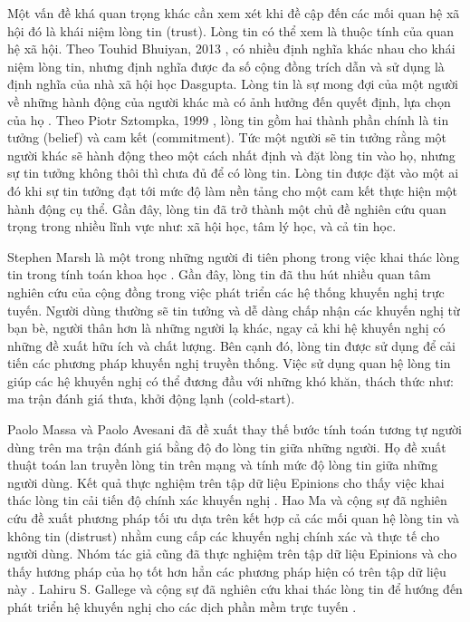 Một vấn đề khá quan trọng khác cần xem xét khi đề cập đến các mối quan hệ xã hội đó là khái niệm lòng tin (trust). Lòng tin có thể xem là thuộc tính của quan hệ xã hội. Theo Touhid Bhuiyan, 2013 \cite{Bhuiyan:2013:TIR:2469991}, có nhiều định nghĩa khác nhau cho khái niệm lòng tin, nhưng định nghĩa được đa số cộng đồng trích dẫn và sử dụng là định nghĩa của nhà xã hội học Dasgupta. Lòng tin là sự mong đợi của một người về những hành động của người khác mà có ảnh hưởng đến quyết định, lựa chọn của họ \cite{Dasgupta1988-DASTAA}. Theo Piotr Sztompka, 1999 \cite{Sztompka1999}, lòng tin gồm hai thành phần chính là tin tưởng (belief) và cam kết (commitment). Tức một người sẽ tin tưởng rằng một người khác sẽ hành động theo một cách nhất định và đặt lòng tin vào họ, nhưng sự tin tưởng không thôi thì chưa đủ để có lòng tin. Lòng tin được đặt vào một ai đó khi sự tin tưởng đạt tới mức độ làm nền tảng cho một cam kết thực hiện một hành động cụ thể. Gần đây, lòng tin đã trở thành một chủ đề nghiên cứu quan trọng trong nhiều lĩnh vực như: xã hội học, tâm lý học, và cả tin học.

Stephen Marsh là một trong những người đi tiên phong trong việc khai thác lòng tin trong tính toán khoa học \cite{Marsh:1994}. Gần đây, lòng tin đã thu hút nhiều quan tâm nghiên cứu của cộng đồng trong việc phát triển các hệ thống khuyến nghị trực tuyến. Người dùng thường sẽ tin tưởng và dễ dàng chấp nhận các khuyến nghị từ bạn bè, người thân hơn là những người lạ khác, ngay cả khi hệ khuyến nghị có những đề xuất hữu ích và chất lượng. Bên cạnh đó, lòng tin được sử dụng để cải tiến các phương pháp khuyến nghị truyền thống. Việc sử dụng quan hệ lòng tin giúp các hệ khuyến nghị có thể đương đầu với những khó khăn, thách thức như: ma trận đánh giá thưa, khởi động lạnh (cold-start).

Paolo Massa và Paolo Avesani đã đề xuất thay thế bước tính toán tương tự người dùng trên ma trận đánh giá bằng độ đo lòng tin giữa những người. Họ đề xuất thuật toán lan truyền lòng tin trên mạng và tính mức độ lòng tin giữa những người dùng. Kết quả thực nghiệm trên tập dữ liệu Epinions cho thấy việc khai thác lòng tin cải tiến độ chính xác khuyến nghị \cite{Massa:2007:TRS:1297231.1297235}. Hao Ma và cộng sự đã nghiên cứu đề xuất phương pháp tối ưu dựa trên kết hợp cả các mối quan hệ lòng tin và không tin (distrust) nhằm cung cấp các khuyến nghị chính xác và thực tế cho người dùng. Nhóm tác giả cũng đã thực nghiệm trên tập dữ liệu Epinions và cho thấy hương pháp của họ tốt hơn hẳn các phương pháp hiện có trên tập dữ liệu này \cite{Ma:2009:LRT:1639714.1639746}. Lahiru S. Gallege và cộng sự đã nghiên cứu khai thác lòng tin để hướng đến phát triển hệ khuyến nghị cho các dịch phần mềm trực tuyến \cite{Gallege:2014:TTR:2602087.2602118}.


